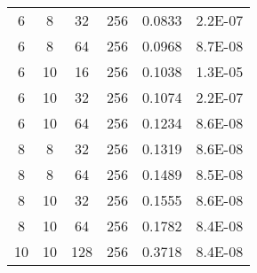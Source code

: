 \begin{table}[]
{\begin{tabular}{cccccc}
\rowcolor[HTML]{77AB59} 
6  & 8  & 32  & 256 & 0.0833 & 2.2E-07 \\
\rowcolor[HTML]{77AB59} 
6  & 8  & 64  & 256 & 0.0968 & 8.7E-08 \\
\rowcolor[HTML]{C9DF8A} 
6  & 10 & 16  & 256 & 0.1038 & 1.3E-05 \\
\rowcolor[HTML]{77AB59} 
6  & 10 & 32  & 256 & 0.1074 & 2.2E-07 \\
\rowcolor[HTML]{77AB59} 
6  & 10 & 64  & 256 & 0.1234 & 8.6E-08 \\
\rowcolor[HTML]{77AB59} 
8  & 8  & 32  & 256 & 0.1319 & 8.6E-08 \\
\rowcolor[HTML]{77AB59} 
8  & 8  & 64  & 256 & 0.1489 & 8.5E-08 \\
\rowcolor[HTML]{77AB59} 
8  & 10 & 32  & 256 & 0.1555 & 8.6E-08 \\
\rowcolor[HTML]{77AB59} 
8  & 10 & 64  & 256 & 0.1782 & 8.4E-08 \\
\rowcolor[HTML]{77AB59} 
10 & 10 & 128 & 256 & 0.3718 & 8.4E-08
\end{tabular}%
}
\end{table}